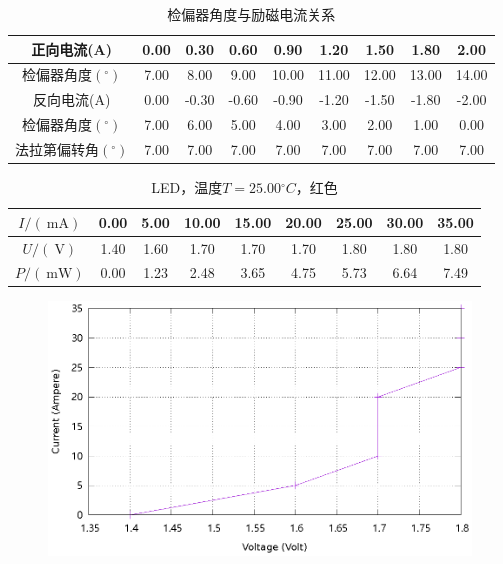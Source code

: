 \documentclass{ctexart}
\newcommand{\si}[1]{\  \mathrm{#1}}
\begin{document}
\newpage
\begin{table}[H]
    \centering
    \begin{tabular}{|c|c|c|c|c|c|c|c|c|}
        \hline
        正向电流(A)  & 0.00 & 0.30 & 0.60 & 0.90 & 1.20 & 1.50  & 1.80  & 2.00 \\\hline
        检偏器角度$({}^{\circ})$ & 7.00 & 8.00 & 9.00 & 10.00 & 11.00 & 12.00 & 13.00 & 14.00 \\\hline
        反向电流(A)  & 0.00  & -0.30 & -0.60 & -0.90 & -1.20 & -1.50 & -1.80 & -2.00 \\\hline
        检偏器角度$({}^{\circ})$ & 7.00 & 6.00 & 5.00 & 4.00 & 3.00 & 2.00 & 1.00 & 0.00 \\\hline
        法拉第偏转角$({}^{\circ})$ & 7.00 & 7.00 & 7.00 & 7.00 & 7.00 & 7.00 & 7.00 & 7.00 \\\hline
    \end{tabular}
    \caption{检偏器角度与励磁电流关系}
\end{table}
\newpage
\begin{table}[H]
    \centering
    \begin{tabular}{|c|c|c|c|c|c|c|c|c|}
        \hline
        $I/(\si{mA})$ & 0.00 & 5.00 & 10.00 & 15.00 & 20.00 & 25.00 & 30.00 & 35.00 \\\hline
        $U / (\si{V})$  & 1.40 & 1.60 & 1.70 & 1.70 & 1.70 & 1.80 & 1.80 & 1.80 \\\hline
        $P / (\si{mW})$ & 0.00 & 1.23 & 2.48 & 3.65 & 4.75 & 5.73 & 6.64 & 7.49 \\\hline
    \end{tabular}
    \caption{LED，温度$T=25.00{}^{\circ}C$，红色}
\end{table}
\begin{figure}[H]
    \centering
    \includegraphics[width=0.9\linewidth]{../output/led-vc-1.gnuplot}
\end{figure}
\end{document}
